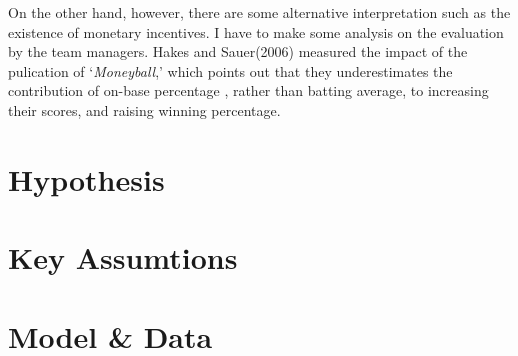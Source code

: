 \documentclass{jsarticle}[12pt]
\begin{document}
\hspace{1zw}On the other hand, however, there are some alternative interpretation such as the existence of monetary incentives. I have to make some analysis on the evaluation by the team managers. Hakes and Sauer(2006) measured the impact of the pulication of `\textit{Moneyball},' which points out that they underestimates the contribution of on-base percentage , rather than batting average, to increasing their scores, and raising winning percentage. 

\section{Hypothesis}



\section{Key Assumtions}



\section{Model \& Data}
\end{document}
